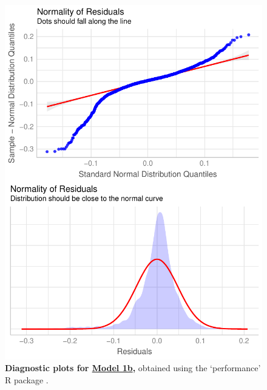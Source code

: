 \begin{figure}[h!]
\centering
\includegraphics[scale=0.7]{Supporting/Chapter3/Figures/Diagnostics/SI_diagnostics_Model1b}
\caption[Diagnostic plots for Model 1b]{\textbf{Diagnostic plots for \underline{Model 1b},} obtained using the `performance' R package \citep{performance}.}
\label{}
\end{figure}

\newpage

